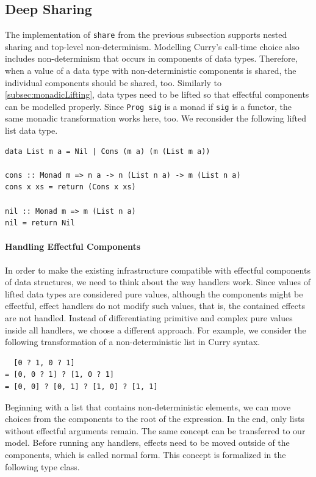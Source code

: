 \documentclass[a4paper, 11pt, fleqn, twoside]{scrreprt}
\newcommand{\todo}[1]{\marginpar{\textbf{TODO:} #1}}
\newcommand{\hinl}[1]{\texttt{#1}}
\begin{document}
\subsection{Deep Sharing}
The implementation of \hinl{share} from the previous subsection supports nested sharing and top-level non-determinism.
Modelling Curry's call-time choice also includes non-determinism that occurs in components of data types.
Therefore, when a value of a data type with non-deterministic components is shared, the individual components should be shared, too.
Similarly to \autoref{subsec:monadicLifting}, data types need to be lifted so that effectful components can be modelled properly.
Since \hinl{Prog sig} is a monad if \hinl{sig} is a functor, the same monadic transformation works here, too.
We reconsider the following lifted list data type.

\begin{verbatim}
data List m a = Nil | Cons (m a) (m (List m a))

cons :: Monad m => n a -> n (List n a) -> m (List n a)
cons x xs = return (Cons x xs)

nil :: Monad m => m (List n a)
nil = return Nil
\end{verbatim}

\paragraph{Handling Effectful Components}
In order to make the existing infrastructure compatible with effectful components of data structures, we need to think about the way handlers work.
Since values of lifted data types are considered pure values, although the components might be effectful, effect handlers do not modify such values, that is, the contained effects are not handled.
Instead of differentiating primitive and complex pure values inside all handlers, we choose a different approach.
For example, we consider the following transformation of a non-deterministic list in Curry syntax.

\begin{verbatim}
  [0 ? 1, 0 ? 1]
= [0, 0 ? 1] ? [1, 0 ? 1]
= [0, 0] ? [0, 1] ? [1, 0] ? [1, 1]
\end{verbatim}

Beginning with a list that contains non-deterministic elements, we can move choices from the components to the root of the expression.
In the end, only lists without effectful arguments remain.
The same concept can be transferred to our model.
Before running any handlers, effects need to be moved outside of the components, which is called normal form.
\todo{normal form strictness?}
This concept is formalized in the following type class.
\end{document}
